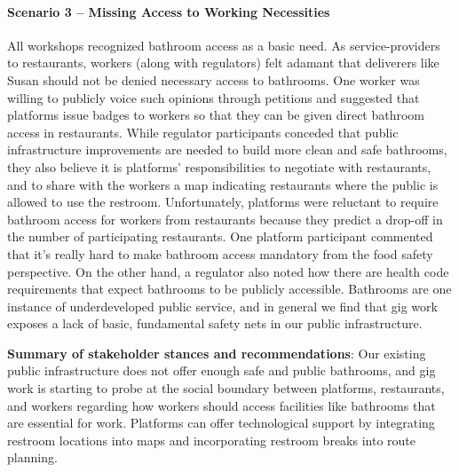 
\FloatBarrier

\paragraph{Scenario 3 -- Missing Access to Working Necessities} \label{s3}
All workshops recognized bathroom access as a basic need. As service-providers to restaurants, workers (along with regulators) felt adamant that deliverers like Susan should not be denied necessary access to bathrooms. One worker was willing to publicly voice such opinions through petitions and suggested that platforms issue badges to workers so that they can be given direct bathroom access in restaurants.
While regulator participants conceded that public infrastructure improvements are needed to build more clean and safe bathrooms, they also believe it is platforms' responsibilities to negotiate with restaurants, and to share with the workers a map indicating restaurants where the public is allowed to use the restroom. Unfortunately, platforms were reluctant to require bathroom access for workers from restaurants because they predict a drop-off in the number of participating restaurants. One platform participant commented that it's really hard to make  bathroom access mandatory from the food safety perspective. On the other hand, a regulator also noted how there are health code requirements that expect bathrooms to be publicly accessible. Bathrooms are one instance of underdeveloped public service, and in general we find that gig work exposes a lack of basic, fundamental safety nets in our public infrastructure.

\textbf{Summary of stakeholder stances and recommendations}: Our existing public infrastructure does not offer enough safe and public bathrooms, and gig work is starting to probe at the social boundary between platforms, restaurants, and workers regarding how workers should access facilities like bathrooms that are essential for work. Platforms can offer technological support by integrating restroom locations into maps and incorporating restroom breaks into route planning.


\FloatBarrier

